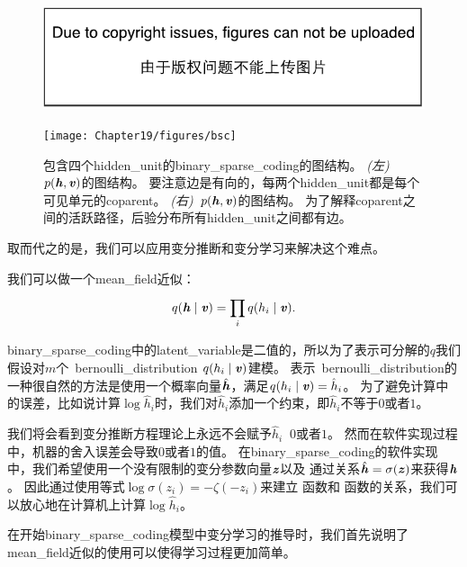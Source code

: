\begin{figure}[!htb]
\ifOpenSource
\centerline{\includegraphics{figure.pdf}}
\else
	\centerline{\texttt{[image: Chapter19/figures/bsc]}}
\fi
\caption{包含四个\gls{hidden_unit}的\gls{binary_sparse_coding}的图结构。
\emph{(左)}~$p(\boldsymbol{\mathit{h}},\boldsymbol{\mathit{v}})$的图结构。
要注意边是有向的，每两个\gls{hidden_unit}都是每个可见单元的\gls{coparent}。
\emph{(右)}~$p(\boldsymbol{\mathit{h}},\boldsymbol{\mathit{v}})$的图结构。
为了解释\gls{coparent}之间的活跃路径，后验分布所有\gls{hidden_unit}之间都有边。}
	\label{fig:bsc}
\end{figure}



取而代之的是，我们可以应用变分推断和变分学习来解决这个难点。


我们可以做一个\gls{mean_field}近似：
\begin{align}
	q(\boldsymbol{\mathit{h}}\mid\boldsymbol{\mathit{v}}) = \prod_{i}^{}q(h_i\mid\boldsymbol{\mathit{v}}).
\end{align}


\gls{binary_sparse_coding}中的\gls{latent_variable}是二值的，所以为了表示可分解的$q$我们假设对$m$个~\gls{bernoulli_distribution} $q(h_i\mid\boldsymbol{\mathit{v}})$建模。
表示~\gls{bernoulli_distribution}的一种很自然的方法是使用一个概率向量$\hat{\boldsymbol{\mathit{h}}}$，满足$q(h_i\mid\boldsymbol{\mathit{v}}) = \hat{h}_i$。
为了避免计算中的误差，比如说计算$\log \hat{h}_i$时，我们对$\hat{h}_i$添加一个约束，即$\hat{h}_i$不等于$0$或者$1$。


我们将会看到变分推断方程理论上永远不会赋予$\hat{h}_i\ $ $0$或者$1$。
然而在软件实现过程中，机器的舍入误差会导致$0$或者$1$的值。
在\gls{binary_sparse_coding}的软件实现中，我们希望使用一个没有限制的变分参数向量$\boldsymbol{\mathit{z}}$以及
通过关系$\hat{\boldsymbol{\mathit{h}}} = \sigma(\boldsymbol{\mathit{z}})$来获得$\boldsymbol{\mathit{h}}$。
因此通过使用等式$\log \sigma(z_i) = -\zeta(-z_i)$来建立\,\,函数和\,\,函数的关系，我们可以放心地在计算机上计算$\log \hat{h}_i$。


在开始\gls{binary_sparse_coding}模型中变分学习的推导时，我们首先说明了\gls{mean_field}近似的使用可以使得学习过程更加简单。


